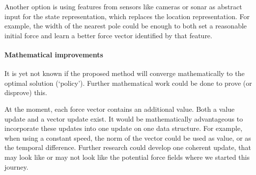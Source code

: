 \documentclass[11pt]{article}
\begin{document}
Another option is using features from sensors like cameras or sonar as abstract input for the state representation, which replaces the location representation. For example, the width of the nearest pole could be enough to both set a reasonable initial force and learn a better force vector identified by that feature.


\paragraph{Mathematical improvements}

It is yet not known if the proposed method will converge mathematically to the optimal solution (`policy'). Further mathematical work could be done to prove (or disprove) this.

At the moment, each force vector contains an additional value. Both a value update and a vector update exist. It would be mathematically advantageous to incorporate these updates into one update on one data structure. For example, when using a constant speed, the norm of the vector could be used as value, or as the temporal difference. Further research could develop one coherent update, that may look like or may not look like the potential force fields where we started this journey.




\end{document}
